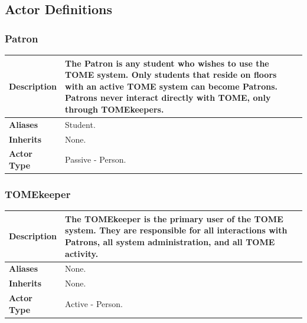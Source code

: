 \documentclass[12pt,titlepage]{article}
\begin{document}
\subsection{Actor Definitions}

\subsubsection{Patron}
\begin{tabular}{|p{}|p{}|}
	\hline
	\textbf{Description} & The Patron is any student who wishes to use the TOME system.  Only students that reside on floors with an active TOME system can become Patrons. Patrons never interact directly with TOME, only through TOMEkeepers.  \\
	\hline
	\textbf{Aliases} & Student. \\
	\hline
	\textbf{Inherits} & None. \\
	\hline
	\textbf{Actor Type} & Passive - Person. \\
	\hline
\end{tabular}

\subsubsection{TOMEkeeper}
\begin{tabular}{|p{}|p{}|}
	\hline
	\textbf{Description} & The TOMEkeeper is the primary user of the TOME system.  They are responsible for all interactions with Patrons, all system administration, and all TOME activity. \\
	\hline
	\textbf{Aliases} & None. \\
	\hline
	\textbf{Inherits} & None. \\
	\hline
	\textbf{Actor Type} & Active - Person. \\
	\hline
\end{tabular}
\end{document}
